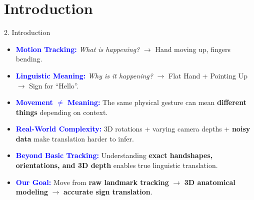 \documentclass[aspectratio=169]{beamer}
\begin{document}
\section{Introduction}
\begin{frame}{2. Introduction}
\small
\setlength{\itemsep}{8pt}

\begin{itemize}
\item \textcolor{blue}{\textbf{Motion Tracking:}} \textit{What is happening?} $\rightarrow$ Hand moving up, fingers bending.
\item \textcolor{blue}{\textbf{Linguistic Meaning:}} \textit{Why is it happening?} $\rightarrow$ Flat Hand + Pointing Up $\rightarrow$ Sign for ``Hello''.
\item \textcolor{blue}{\textbf{Movement $\neq$ Meaning:}} The same physical gesture can mean \textbf{different things} depending on context.
\item \textcolor{blue}{\textbf{Real-World Complexity:}} 3D rotations + varying camera depths + \textbf{noisy data} make translation harder to infer.
\item \textcolor{blue}{\textbf{Beyond Basic Tracking:}} Understanding \textbf{exact handshapes, orientations, and 3D depth} enables true linguistic translation.
\item \textcolor{blue}{\textbf{Our Goal:}} Move from \textbf{raw landmark tracking} $\rightarrow$ \textbf{3D anatomical modeling} $\rightarrow$ \textbf{accurate sign translation}.
\end{itemize}
\end{frame}

\end{document}
